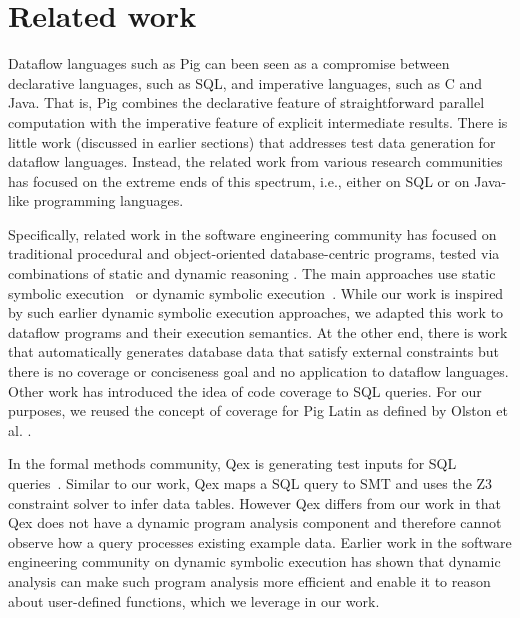 \section{Related work}
\label{sec:related}

Dataflow languages such as Pig can been seen as a compromise between
declarative languages, such as SQL, and imperative languages, such as C
and Java. That is, Pig combines the declarative feature of
straightforward parallel computation with the imperative feature of
explicit intermediate results. 
There is little work (discussed in earlier sections) that addresses
test data generation for dataflow languages. Instead, the
related work from various research communities has focused on the
extreme ends of this spectrum, i.e., either on SQL or on Java-like
programming languages.

Specifically, related work in the software engineering community has
focused on traditional procedural and object-oriented database-centric
programs, tested via combinations of static and dynamic reasoning
\cite{DBLP:conf/tap/SmaragdakisC07}. The main approaches use static
symbolic execution~\cite{marcozzi12test} or dynamic symbolic
execution~\cite{emmi07dynamic,li10dynamic,pan11generating}.  While our
work is inspired by such earlier dynamic symbolic execution
approaches, we adapted this work to dataflow programs and their
execution semantics. At the other end, there is work that
automatically generates database data that satisfy external
constraints \cite{orm-ase07} but there is no coverage or conciseness
goal and no application to dataflow languages. Other work
\cite{tuya10full} has introduced the idea of code coverage to SQL
queries. For our purposes, we reused the concept of coverage for Pig
Latin as defined by Olston et al.
\cite{Olston:2009:GED:1559845.1559873}.


In the formal methods community, Qex is generating test inputs for SQL 
queries~\cite{veanes10qex}. Similar to our work, Qex maps a SQL
query to SMT and uses the Z3 constraint solver to infer data tables.
However Qex differs from our work in that Qex does not have a dynamic 
program analysis component and therefore cannot observe how a query
processes existing example data. Earlier work in the software engineering
community on dynamic symbolic execution has shown that dynamic analysis
can make such program analysis more efficient and enable it to reason
about user-defined functions, which we leverage in our work.

